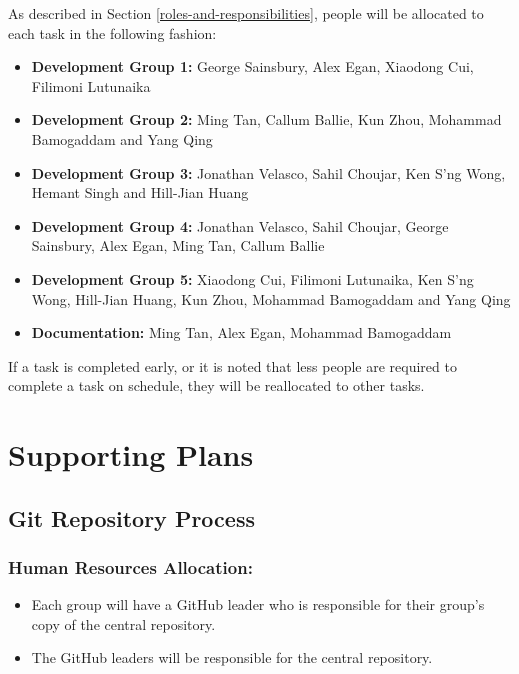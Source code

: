 \documentclass{article}
\begin{document}
As described in Section \ref{roles-and-responsibilities}, people will be allocated to each task in the following fashion:

\begin{itemize}
	
\item \textbf{Development Group 1:} George Sainsbury, Alex Egan, Xiaodong Cui, Filimoni Lutunaika \\

\item \textbf{Development Group 2:} Ming Tan, Callum Ballie, Kun Zhou, Mohammad Bamogaddam and Yang Qing\\

\item \textbf{Development Group 3:} Jonathan Velasco, Sahil Choujar, Ken S'ng Wong, Hemant Singh and Hill-Jian Huang\\

\item \textbf{Development Group 4:} Jonathan Velasco, Sahil Choujar, George Sainsbury, Alex Egan, Ming Tan, Callum Ballie\\

\item \textbf{Development Group 5:} Xiaodong Cui, Filimoni Lutunaika, Ken S'ng Wong, Hill-Jian Huang, Kun Zhou, Mohammad Bamogaddam and Yang Qing\\

\item \textbf{Documentation:} Ming Tan, Alex Egan, Mohammad Bamogaddam\\

\end{itemize}

If a task is completed early, or it is noted that less people are required to complete a task on schedule, they will be reallocated to other tasks.\\

\section{Supporting Plans}

\subsection{Git Repository Process}

\subsubsection{Human Resources Allocation:}
\begin{itemize}	
\item Each group will have a GitHub leader who is responsible for their group's copy of the central repository.
\item The GitHub leaders will be responsible for the central repository.
\end{itemize}
\end{document}
